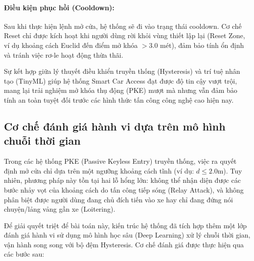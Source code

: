 \paragraph*{Điều kiện phục hồi (Cooldown):} 
Sau khi thực hiện lệnh mở cửa, hệ thống sẽ đi vào trạng thái cooldown. Cơ chế Reset chỉ được kích hoạt khi người dùng rời khỏi vùng thiết lập lại (Reset Zone, ví dụ khoảng cách Euclid đến điểm mở khóa $> 3.0$ mét), đảm bảo tính ổn định và tránh việc rơ-le hoạt động thừa thãi.

Sự kết hợp giữa lý thuyết điều khiển truyền thống (Hysteresis) và trí tuệ nhân tạo (TinyML) giúp hệ thống Smart Car Access đạt được độ tin cậy vượt trội, mang lại trải nghiệm mở khóa thụ động (PKE) mượt mà nhưng vẫn đảm bảo tính an toàn tuyệt đối trước các hình thức tấn công công nghệ cao hiện nay.



\iffalse
\subsection{Cơ chế đánh giá hành vi dựa trên mô hình chuỗi thời gian}

Trong các hệ thống PKE (Passive Keyless Entry) truyền thống, việc ra quyết định mở cửa chỉ dựa trên một ngưỡng khoảng cách tĩnh (ví dụ: $d \le 2.0$m). Tuy nhiên, phương pháp này tồn tại hai lỗ hổng lớn: không thể nhận diện được các bước nhảy vọt của khoảng cách do tấn công tiếp sóng (Relay Attack), và không phân biệt được người dùng đang chủ đích tiến vào xe hay chỉ đang đứng nói chuyện/lảng vảng gần xe (Loitering).

Để giải quyết triệt để bài toán này, kiến trúc hệ thống đã tích hợp thêm một lớp đánh giá hành vi sử dụng mô hình học sâu (Deep Learning) xử lý chuỗi thời gian, vận hành song song với bộ đệm Hysteresis. Cơ chế đánh giá được thực hiện qua các bước sau:

